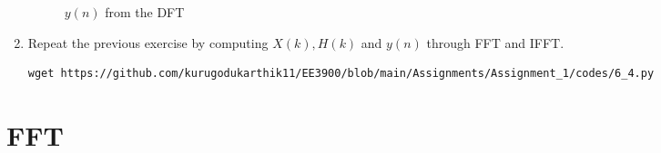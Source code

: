 \documentclass[journal,12pt,twocolumn]{IEEEtran}
\renewcommand\thesection{\arabic{section}}
\begin{document}
\begin{enumerate}[label=\thesection.\arabic*]
\begin{figure}[!ht]
\caption{$y(n)$ from the DFT}
\label{fig:yndft}
\end{figure}
\item Repeat the previous exercise by computing $X(k), H(k)$ and $y(n)$ through FFT and 
IFFT.
\\
\solution
\begin{lstlisting}
wget https://github.com/kurugodukarthik11/EE3900/blob/main/Assignments/Assignment_1/codes/6_4.py
\end{lstlisting}
\end{enumerate}
\section{FFT}
\end{document}
